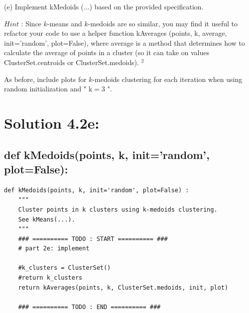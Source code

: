 \documentclass[10pt]{article}
\begin{document}
(e) Implement kMedoids (...) based on the provided specification.

$H i n t$ : Since $k$-means and $k$-medoids are so similar, you may find it useful to refactor your code to use a helper function kAverages (points, k, average, init='random', plot=False), where average is a method that determines how to calculate the average of points in a cluster (so it can take on values ClusterSet.centroids or ClusterSet.medoids). ${ }^{2}$

As before, include plots for $k$-medoids clustering for each iteration when using random initialization and " $\mathrm{k}=3$ ".

\section*{Solution 4.2e:}

\subsection*{def kMedoids(points, k, init='random', plot=False):}
\begin{verbatim}
def kMedoids(points, k, init='random', plot=False) :
    """
    Cluster points in k clusters using k-medoids clustering.
    See kMeans(...).
    """
    ### ========== TODO : START ========== ###
    # part 2e: implement

    #k_clusters = ClusterSet()
    #return k_clusters
    return kAverages(points, k, ClusterSet.medoids, init, plot)

    ### ========== TODO : END ========== ###
\end{verbatim}
\end{document}
